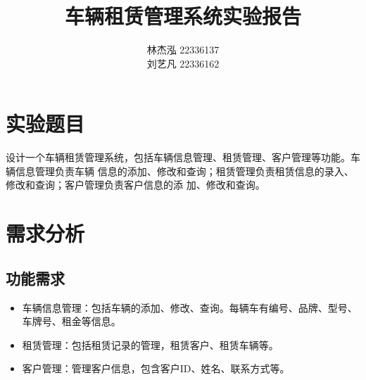 \documentclass[UTF8,a4paper,12pt]{ctexart}
\title{\textbf{\Large{车辆租赁管理系统实验报告}}}
\author{ 林杰泓 22336137\\刘艺凡 22336162}
\begin{document}
 
\maketitle
 
 
 
 
 
\newpage 
\tableofcontents
\newpage
\section{实验题目}
设计一个车辆租赁管理系统，包括车辆信息管理、租赁管理、客户管理等功能。车辆信息管理负责车辆
信息的添加、修改和查询；租赁管理负责租赁信息的录入、修改和查询；客户管理负责客户信息的添
加、修改和查询。
\section{需求分析}

\subsection{功能需求}

\begin{itemize}
    \item 车辆信息管理：包括车辆的添加、修改、查询。每辆车有编号、品牌、型号、车牌号、租金等信息。
    \item 租赁管理：包括租赁记录的管理，租赁客户、租赁车辆等。
    \item 客户管理：管理客户信息，包含客户ID、姓名、联系方式等。
\end{itemize}
\end{document}
